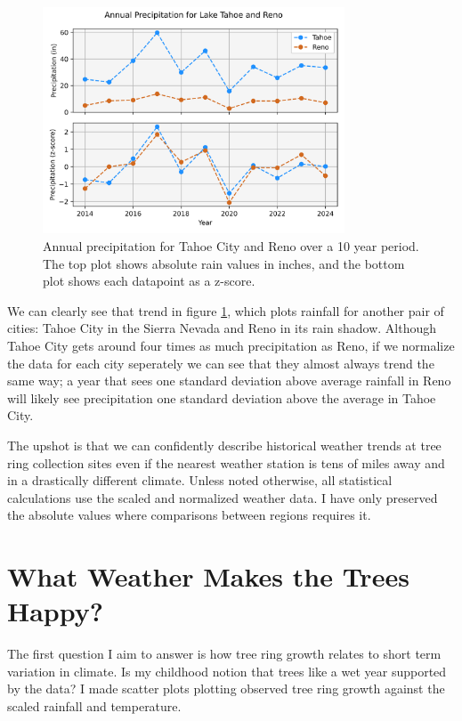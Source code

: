 \documentclass[]{article}
\begin{document}
\begin{figure}
	\centering
	\includegraphics[width=0.8\textwidth]{renotahoe.png}
	\caption{Annual precipitation for Tahoe City and Reno over a 10 year period. The top plot shows absolute rain values in inches, and the bottom plot shows each datapoint as a z-score.}
	\label{fig:reno_tahoe}
\end{figure}
We can clearly see that trend in figure \ref{fig:reno_tahoe}, which plots rainfall for another pair of cities: Tahoe City in the Sierra Nevada and Reno in its rain shadow. Although Tahoe City gets around four times as much precipitation as Reno, if we normalize the data for each city seperately we can see that they almost always trend the same way; a year that sees one standard deviation above average rainfall in Reno will likely see precipitation one standard deviation above the average in Tahoe City.

The upshot is that we can confidently describe historical weather trends at tree ring collection sites even if the nearest weather station is tens of miles away and in a drastically different climate. Unless noted otherwise, all statistical calculations use the scaled and normalized weather data. I have only preserved the absolute values where comparisons between regions requires it.

\section{What Weather Makes the Trees Happy?}
The first question I aim to answer is how tree ring growth relates to short term variation in climate. Is my childhood notion that trees like a wet year supported by the data?  I made scatter plots plotting observed tree ring growth against the scaled rainfall and temperature.
\end{document}
